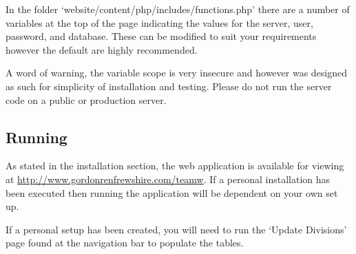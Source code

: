 In the folder `website/content/php/includes/functions.php' there are a number
of variables at the top of the page indicating the values for the server, user,
password, and database. These can be modified to suit your requirements however
the default are highly recommended.

A word of warning, the variable scope is very insecure and however was designed
as such for simplicity of installation and testing. Please do not run the server
code on a public or production server.

\subsection{Running}

As stated in the installation section, the web application is available for
viewing at \url{http://www.gordonrenfrewshire.com/teamw}. If a personal
installation has been executed then running the application will be dependent
on your own set up.

If a personal setup has been created, you will need to run the `Update
Divisions' page found at the navigation bar to populate the tables.